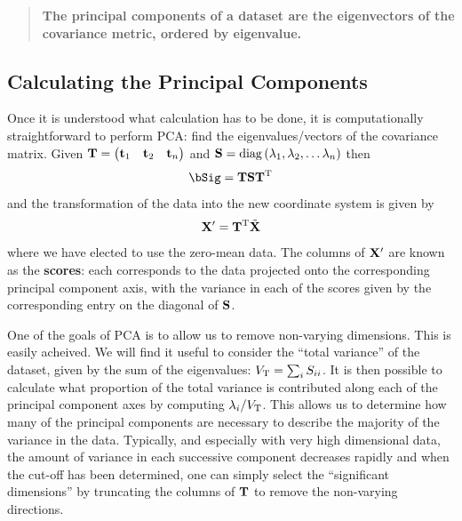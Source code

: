 \documentclass[12pt,a4paper]{tufte-handout}
\begin{document}
\begin{quote}
\textbf{The principal components of a dataset are the eigenvectors of the covariance metric, ordered by eigenvalue.}
\end{quote}

\subsection{Calculating the Principal Components}

Once it is understood what calculation has to be done, it is computationally straightforward to perform PCA: find the eigenvalues/vectors of the covariance matrix. Given $\mathbf{T} = \begin{pmatrix}\mathbf{t}_1 & \mathbf{t}_2 & \mathbf{t}_n\end{pmatrix}$ and $\mathbf{S}=\operatorname*{diag}\left(\lambda_1,\lambda_2,\dots\lambda_n\right)$ then
\begin{equation}
  \bSig = \bT\bS\bT^\rT
\end{equation}
and the transformation of the data into the new coordinate system is given by
\begin{equation}
  \mathbf{X}' = \mathbf{T}^{\mathrm{T}}\tilde{\mathbf{X}}
\end{equation}
where we have elected to use the zero-mean data. The columns of $\mathbf{X}'$ are known as the \textbf{scores}: each corresponds to the data projected onto the corresponding principal component axis, with the variance in each of the scores given by the corresponding entry on the diagonal of $\mathbf{S}$. 

One of the goals of PCA is to allow us to remove non-varying dimensions. This is easily acheived. We will find it useful to consider the ``total variance'' of the dataset, given by the sum of the eigenvalues: $V_{\mathrm{T}} = \sum_i S_{ii}$. It is then possible to calculate what proportion of the total variance is contributed along each of the principal component axes by computing $\lambda_i/V_{\mathrm{T}}$. This allows us to determine how many of the principal components are necessary to describe the majority of the variance in the data. Typically, and especially with very high dimensional data, the amount of variance in each successive component decreases rapidly and when the cut-off has been determined, one can simply select the ``significant dimensions'' by truncating the columns of $\mathbf{T}$ to remove the non-varying directions.
\end{document}
